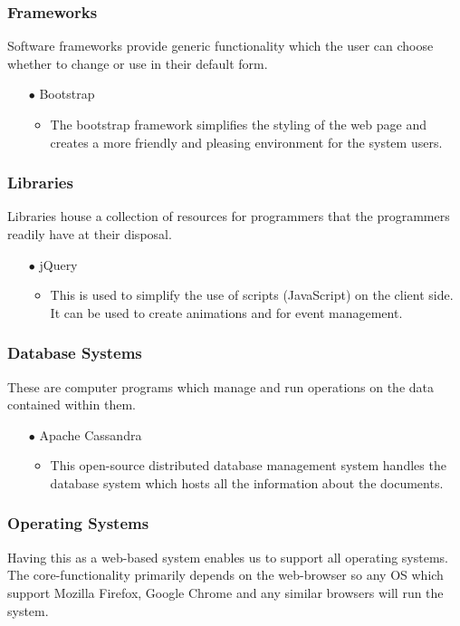 \documentclass[a4paper,12pt]{article}
\begin{document}
\begin{flushleft}
	\subsubsection{Frameworks}
	Software frameworks provide generic functionality which the user can choose whether to change or use in their default form.
	
	\begin{itemize}
		\item[$\bullet$] Bootstrap
		\begin{itemize}
		\item The bootstrap framework simplifies the styling of the web page and creates a more friendly and pleasing environment for the system users.	
		\end{itemize}
	\end{itemize}
	
	\subsubsection{Libraries}
	Libraries house a collection of resources for programmers that the programmers readily have at their disposal.
	
	\begin{itemize}
		\item[$\bullet$] jQuery
		\begin{itemize}
		\item This is used to simplify the use of scripts (JavaScript) on the client side. It can be used to create animations and for event management.
		\end{itemize}
	\end{itemize}
	
	\subsubsection{Database Systems}
	These are computer programs which manage and run operations on the data contained within them.
	
	\begin{itemize}
		\item[$\bullet$] Apache Cassandra
		\begin{itemize}
		\item This open-source distributed database management system handles the database system which hosts all the information about the documents.
		\end{itemize}
	\end{itemize}
	
	\subsubsection{Operating Systems}
	Having this as a web-based system enables us to support all operating systems. The core-functionality primarily depends on the web-browser so any OS which support Mozilla Firefox, Google Chrome and any similar browsers will run the system.

\end{flushleft}
\end{document}
